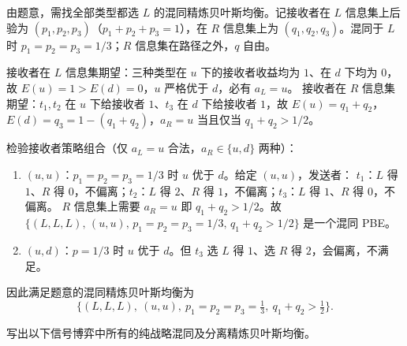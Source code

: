 \sol 由题意，需找全部类型都选 $L$ 的混同精炼贝叶斯均衡。记接收者在 $L$ 信息集上后验为 $(p_1,p_2,p_3)$（$p_1+p_2+p_3=1$），在 $R$ 信息集上为 $(q_1,q_2,q_3)$。混同于 $L$ 时 $p_1=p_2=p_3=1/3$；$R$ 信息集在路径之外，$q$ 自由。

接收者在 $L$ 信息集期望：三种类型在 $u$ 下的接收者收益均为 $1$、在 $d$ 下均为 $0$，故 $E(u)=1>E(d)=0$，$u$ 严格优于 $d$，必有 $a_L=u$。
接收者在 $R$ 信息集期望：$t_1,t_2$ 在 $u$ 下给接收者 $1$、$t_3$ 在 $d$ 下给接收者 $1$，故 $E(u)=q_1+q_2$，$E(d)=q_3=1-(q_1+q_2)$，$a_R=u$ 当且仅当 $q_1+q_2>1/2$。

检验接收者策略组合（仅 $a_L=u$ 合法，$a_R\in\{u,d\}$ 两种）：

\begin{enumerate}[leftmargin=1.8em, label=(\arabic*)]
  \item $(u,u)$：$p_1=p_2=p_3=1/3$ 时 $u$ 优于 $d$。给定 $(u,u)$，发送者：
    $t_1$：$L$ 得 $1$、$R$ 得 $0$，不偏离；$t_2$：$L$ 得 $2$、$R$ 得 $1$，不偏离；$t_3$：$L$ 得 $1$、$R$ 得 $0$，不偏离。
    $R$ 信息集上需要 $a_R=u$ 即 $q_1+q_2>1/2$。故 $\{(L,L,L),\,(u,u),\,p_1=p_2=p_3=1/3,\,q_1+q_2>1/2\}$ 是一个混同 PBE。
  \item $(u,d)$：$p=1/3$ 时 $u$ 优于 $d$。但 $t_3$ 选 $L$ 得 $1$、选 $R$ 得 $2$，会偏离，不满足。
\end{enumerate}

因此满足题意的混同精炼贝叶斯均衡为
\[
  \bigl\{(L,L,L),\ (u,u),\ p_1=p_2=p_3=\tfrac13,\ q_1+q_2>\tfrac12\bigr\}.
\]

写出以下信号博弈中所有的纯战略混同及分离精炼贝叶斯均衡。

